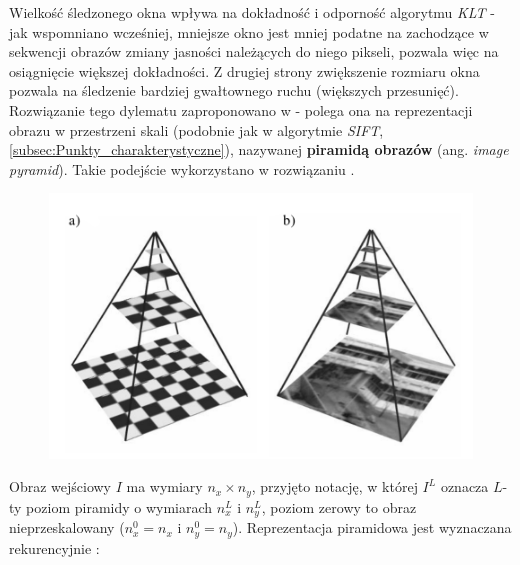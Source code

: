 Wielkość śledzonego okna wpływa na dokładność i odporność algorytmu \textit{KLT} - jak wspomniano wcześniej, mniejsze okno jest mniej podatne na zachodzące w sekwencji obrazów zmiany jasności należących do niego pikseli, pozwala więc na osiągnięcie większej dokładności. Z drugiej strony zwiększenie rozmiaru okna pozwala na śledzenie bardziej gwałtownego ruchu (większych przesunięć). Rozwiązanie tego dylematu zaproponowano w \cite{Bouguet2000} - polega ona na reprezentacji obrazu w przestrzeni skali (podobnie jak w algorytmie \textit{SIFT}, \ref{subsec:Punkty_charakterystyczne}), nazywanej \textbf{piramidą obrazów} (ang. \textit{image pyramid}). Takie podejście wykorzystano w rozwiązaniu \cite{Markovic2014}.

\begin{figure}[!htb]
	\begin{center}
		\includegraphics[width=12cm]{images/image_pyramid.png}
	\end{center}	
\label{fig:Przyklad_piramidy_obrazow}
\end{figure}

Obraz wejściowy $I$ ma wymiary $n_x \times n_y$, przyjęto notację, w której $I^L$ oznacza $L$-ty poziom piramidy o wymiarach $n_x^L$ i $n_y^L$, poziom zerowy to obraz nieprzeskalowany ($n_x^0 = n_x$ i $n_y^0 = n_y$). Reprezentacja piramidowa jest wyznaczana rekurencyjnie \cite{Bouguet2000}:


